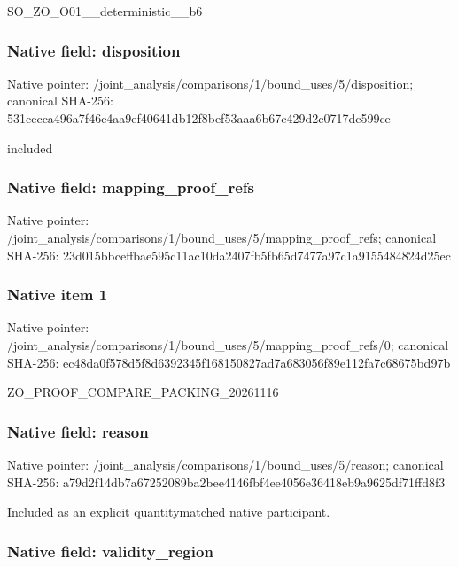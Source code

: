 \documentclass[10pt,a4paper]{article}
\begin{document}
SO\_ZO\_O01\_\_deterministic\_\_b6


\subsubsection{Native field: disposition}


Native pointer: /joint\_analysis/comparis\allowbreak{}ons/1/bound\_uses/5/dispo\allowbreak{}sition; canonical SHA-256: 531cecca496a7f46e4aa9ef4\allowbreak{}0641db12f8bef53aaa6b67c4\allowbreak{}29d2c0717dc599ce


included


\subsubsection{Native field: mapping\_proof\_refs}


Native pointer: /joint\_analysis/comparis\allowbreak{}ons/1/bound\_uses/5/mappi\allowbreak{}ng\_proof\_refs; canonical SHA-256: 23d015bbceffbae595c11ac1\allowbreak{}0da2407fb5fb65d7477a97c1\allowbreak{}a9155484824d25ec



\subsubsection{Native item 1}


Native pointer: /joint\_analysis/comparis\allowbreak{}ons/1/bound\_uses/5/mappi\allowbreak{}ng\_proof\_refs/0; canonical SHA-256: ec48da0f578d5f8d6392345f\allowbreak{}168150827ad7a683056f89e1\allowbreak{}12fa7c68675bd97b


ZO\_PROOF\_COMPARE\_PACKING\_20261116


\subsubsection{Native field: reason}


Native pointer: /joint\_analysis/comparis\allowbreak{}ons/1/bound\_uses/5/reaso\allowbreak{}n; canonical SHA-256: a79d2f14db7a67252089ba2b\allowbreak{}ee4146fbf4ee4056e36418eb\allowbreak{}9a9625df71ffd8f3


Included as an explicit quantitymatched native participant.


\subsubsection{Native field: validity\_region}
\end{document}
